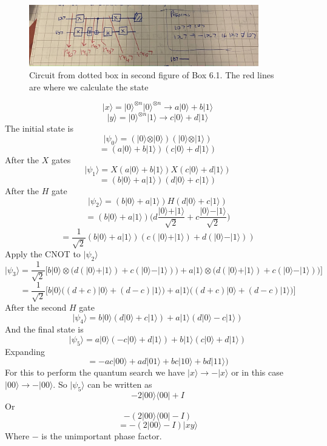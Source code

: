 \documentclass[12pt]{article}
\newcommand{\ket}[1]{\vert{#1}\rangle}
\newcommand{\bra}[1]{\langle{#1}\vert}
\begin{document}
\begin{enumerate}
\begin{figure}[h]
        \includegraphics[width=10cm]{Phasecircuit.jpg}
        \centering
        \caption{Circuit from dotted box in second figure of Box 6.1. The red lines are where we calculate the state}

    \end{figure}
    $$ \ket{x} = \ket{0}^{\otimes n} \ket{0}^{\otimes n} \rightarrow a \ket{0} + b \ket{1} $$
    $$ \ket{y} = \ket{0}^{\otimes n} \ket{1} \rightarrow c \ket{0} + d \ket{1} $$
    The initial state is 
    $$ \ket{\psi_0} =(\ket{0} \otimes \ket{0})(\ket{0} \otimes \ket{1}) $$
    $$ = (a \ket{0} + b\ket{1})( c \ket{0} + d\ket{1}) $$
    After the $X$ gates 
    $$ \ket{\psi_1} = X(a \ket{0} + b \ket{1}) X (c \ket{0} + d \ket{1}) $$
    $$ = (b \ket{0} + a \ket{1})(d \ket{0} + c \ket{1}) $$
    After the $H$ gate 
    $$ \ket{\psi_2} = ( b\ket{0} + a\ket{1})H(d \ket{0} + c\ket{1}) $$
    $$ =(b \ket{0} + a \ket{1})\Big( d \frac{\ket{0} + \ket{1}}{\sqrt{2}} + c \frac{\ket{0} - \ket{1}}{\sqrt{2}}\Big)$$
    $$ = \frac{1}{\sqrt{2}} (b \ket{0} + a \ket{1})(c (\ket{0} + \ket{1}) + d(\ket{0} - \ket{1})) $$
    Apply the CNOT to $\ket{\psi_2}$ 
    $$ \ket{\psi_3} = \frac{1}{\sqrt{2}} \Big[ b \ket{0} \otimes \Big( d (\ket{0} + \ket{1}) + c(\ket{0} - \ket{1}) \Big) + a \ket{1} \otimes \Big( d(\ket{0} + \ket{1}) + c(\ket{0} - \ket{1}) \Big) \Big]$$
    $$ = \frac{1}{\sqrt{2}} \Big[ b \ket{0} \big( ( d+c)\ket{0} + (d-c)\ket{1} \big) + a \ket{1} \big( (d+c)\ket{0} + (d-c) \ket{1} \big) \Big] $$
    After the second $H$ gate
    $$ \ket{\psi_4} = b \ket{0} ( d \ket{0} + c \ket{1}) + a \ket{1} ( d\ket{0} - c \ket{1}) $$
    And the final state is 
    $$ \ket{\psi_5} = a \ket{0} (-c \ket{0} + d \ket{1}) + b\ket{1}(c \ket{0} + d \ket{1})$$
    Expanding 
    $$ = -a c \ket{00} + ad \ket{01} + bc \ket{10} + bd \ket{11}) $$
    For this to perform the quantum search we have $\ket{x} \rightarrow - \ket{x}$ or in this case $\ket{00} \rightarrow - \ket{00} $. So $\ket{\psi_5}$ can be written as 
    $$ -2 \ket{00} \bra{00} + I $$ 
    Or 
    $$ -(2 \ket{00} \bra{00} - I)  $$
    $$ = -( 2 \ket{00} - I) \ket{xy} $$
    Where $-$ is the unimportant phase factor. 


\end{enumerate}
\end{document}
